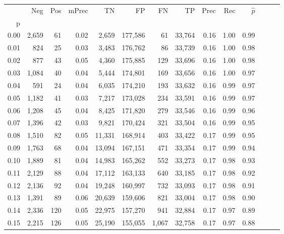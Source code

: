 \begin{tabular}{rrrrrrrrrrrrrr}
\toprule
{} &    Neg &  Pos & mPrec &       TN &       FP &      FN &      TP &  Prec &   Rec & $\hat{p}$ \\
p    &        &      &       &          &          &         &         &       &       &           \\
\midrule
0.00 &  2,659 &   61 &  0.02 &    2,659 &  177,586 &      61 &  33,764 &  0.16 &  1.00 &      0.99 \\
0.01 &    824 &   25 &  0.03 &    3,483 &  176,762 &      86 &  33,739 &  0.16 &  1.00 &      0.98 \\
0.02 &    877 &   43 &  0.05 &    4,360 &  175,885 &     129 &  33,696 &  0.16 &  1.00 &      0.98 \\
0.03 &  1,084 &   40 &  0.04 &    5,444 &  174,801 &     169 &  33,656 &  0.16 &  1.00 &      0.97 \\
0.04 &    591 &   24 &  0.04 &    6,035 &  174,210 &     193 &  33,632 &  0.16 &  0.99 &      0.97 \\
0.05 &  1,182 &   41 &  0.03 &    7,217 &  173,028 &     234 &  33,591 &  0.16 &  0.99 &      0.97 \\
0.06 &  1,208 &   45 &  0.04 &    8,425 &  171,820 &     279 &  33,546 &  0.16 &  0.99 &      0.96 \\
0.07 &  1,396 &   42 &  0.03 &    9,821 &  170,424 &     321 &  33,504 &  0.16 &  0.99 &      0.95 \\
0.08 &  1,510 &   82 &  0.05 &   11,331 &  168,914 &     403 &  33,422 &  0.17 &  0.99 &      0.95 \\
0.09 &  1,763 &   68 &  0.04 &   13,094 &  167,151 &     471 &  33,354 &  0.17 &  0.99 &      0.94 \\
0.10 &  1,889 &   81 &  0.04 &   14,983 &  165,262 &     552 &  33,273 &  0.17 &  0.98 &      0.93 \\
0.11 &  2,129 &   88 &  0.04 &   17,112 &  163,133 &     640 &  33,185 &  0.17 &  0.98 &      0.92 \\
0.12 &  2,136 &   92 &  0.04 &   19,248 &  160,997 &     732 &  33,093 &  0.17 &  0.98 &      0.91 \\
0.13 &  1,391 &   89 &  0.06 &   20,639 &  159,606 &     821 &  33,004 &  0.17 &  0.98 &      0.90 \\
0.14 &  2,336 &  120 &  0.05 &   22,975 &  157,270 &     941 &  32,884 &  0.17 &  0.97 &      0.89 \\
0.15 &  2,215 &  126 &  0.05 &   25,190 &  155,055 &   1,067 &  32,758 &  0.17 &  0.97 &      0.88 \\

\end{tabular}
